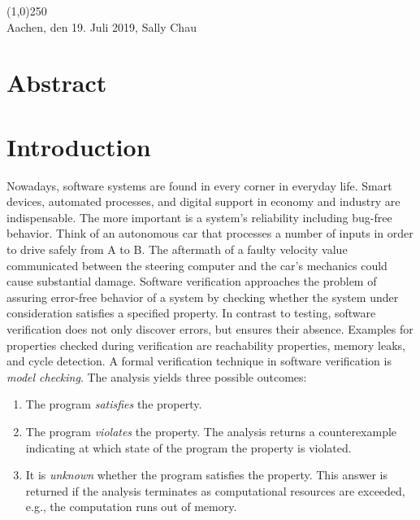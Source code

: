 \documentclass[a4paper, 12pt, twoside]{report}
\begin{document}
	\noindent\line(1,0){250}\\
	Aachen, den 19. Juli 2019, Sally Chau
	
	\clearpage\mbox{}\clearpage
	
	\chapter*{Abstract}
	
	\clearpage\mbox{}\clearpage
	
	\doublespacing
	\tableofcontents
	\singlespacing
	\clearpage\mbox{}\clearpage
	\thispagestyle{empty} 
	
	\pagestyle{fancy}
	\fancyhead[RE]{\nouppercase\leftmark}
	\fancyhead[LO]{\nouppercase\rightmark}
	\fancyhead[LE,RO]{\thepage}
	\cfoot{}
	
	
	\chapter{Introduction}\label{chp:intro}
	
	Nowadays, software systems are found in every corner in everyday life. Smart devices, automated processes, and digital support in economy and industry are indispensable. The more important is a system's reliability including bug-free behavior. Think of an autonomous car that processes a number of inputs in order to drive safely from A to B. The aftermath of a faulty velocity value communicated between the steering computer and the car's mechanics could cause substantial damage. Software verification approaches the problem of assuring error-free behavior of a system by checking whether the system under consideration satisfies a specified property. In contrast to testing, software verification does not only discover errors, but ensures their absence. Examples for properties checked during verification are reachability properties, memory leaks, and cycle detection. A formal verification technique in software verification is \textit{model checking}. The analysis yields three possible outcomes:
	
	\begin{enumerate}
		\item The program \textit{satisfies} the property.
		\item The program \textit{violates} the property. The analysis returns a counterexample indicating at which state of the program the property is violated. 		
		\item It is \textit{unknown} whether the program satisfies the property. This answer is returned if the analysis terminates as computational resources are exceeded, e.g., the computation runs out of memory.
	\end{enumerate}   
\end{document}
